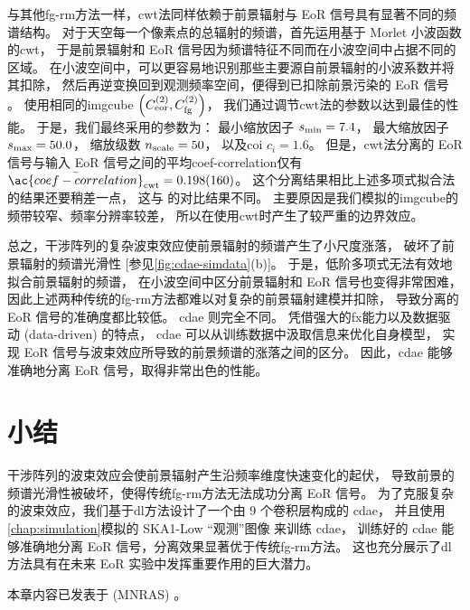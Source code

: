 与其他\ac{fg-rm}方法一样，\ac{cwt}法同样依赖于前景辐射与 EoR 信号具有显著不同的频谱结构。
对于天空每一个像素点的总辐射的频谱，首先运用基于 Morlet 小波函数的\ac{cwt}，
于是前景辐射和 EoR 信号因为频谱特征不同而在小波空间中占据不同的区域。
在小波空间中，可以更容易地识别那些主要源自前景辐射的小波系数并将其扣除，
然后再逆变换回到观测频率空间，便得到已扣除前景污染的 EoR 信号 \cite{gu2013}。
使用相同的\ac{imgcube}
$\left( C_{\mathrm{eor}}^{(2)}, C_{\mathrm{fg}}^{(2)} \right)$，
我们通过调节\ac{cwt}法的参数以达到最佳的性能。
于是，我们最终采用的参数为：
最小缩放因子 $s_{\mathrm{min}} = 7.4$，
最大缩放因子 $s_{\mathrm{max}} = 50.0$，
缩放级数 $n_{\mathrm{scale}} = 50$，
以及\ac{coi} $c_i = 1.6$。
但是，\ac{cwt}法分离的 EoR 信号与输入 EoR 信号之间的平均\acl{coef-correlation}仅有
$\bar{\ac{coef-correlation}}_{\R{cwt}} = \num{0.198 +- 0.160}$。
这个分离结果相比上述多项式拟合法的结果还要稍差一点，
这与  的对比结果不同。
主要原因是我们模拟的\ac{imgcube}的频带较窄、频率分辨率较差，
所以在使用\ac{cwt}时产生了较严重的边界效应。

总之，干涉阵列的复杂波束效应使前景辐射的频谱产生了小尺度涨落，
破坏了前景辐射的频谱光滑性 [参见\autoref{fig:cdae-simdata}(b)]。
于是，低阶多项式无法有效地拟合前景辐射的频谱，
在小波空间中区分前景辐射和 EoR 信号也变得非常困难，
因此上述两种传统的\ac{fg-rm}方法都难以对复杂的前景辐射建模并扣除，
导致分离的 EoR 信号的准确度都比较低。
\ac{cdae} 则完全不同。
凭借强大的\ac{fx}能力以及数据驱动 (data-driven) 的特点，
\ac{cdae} 可以从训练数据中汲取信息来优化自身模型，
实现 EoR 信号与波束效应所导致的前景频谱的涨落之间的区分。
因此，\ac{cdae} 能够准确地分离 EoR 信号，取得非常出色的性能。


\section{小结}

干涉阵列的波束效应会使前景辐射产生沿频率维度快速变化的起伏，
导致前景的频谱光滑性被破坏，使得传统\ac{fg-rm}方法无法成功分离 EoR 信号。
为了克服复杂的波束效应，我们基于\ac{dl}方法设计了一个由 9 个卷积层构成的 \ac{cdae}，
并且使用\autoref{chap:simulation}模拟的 SKA1-Low \enquote{观测}图像
来训练 \ac{cdae}，
训练好的 \ac{cdae} 能够准确地分离 EoR 信号，分离效果显著优于传统\ac{fg-rm}方法。
这也充分展示了\ac{dl}方法具有在未来 EoR 实验中发挥重要作用的巨大潜力。

本章内容已发表于 \mnras{} (MNRAS) \cite{li.cdae}。


